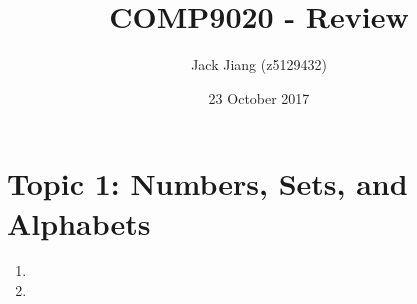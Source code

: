 \documentclass[11pt, a4paper]{article}
\begin{document}
\title{COMP9020 - Review}
\author{Jack Jiang (z5129432)}
\date{ 23 October 2017 }
\maketitle
\graphicspath{{/}}

\section*{Topic 1: Numbers, Sets, and Alphabets}
\begin{enumerate}
    \item

    \item
    \end{enumerate}
\end{document}
